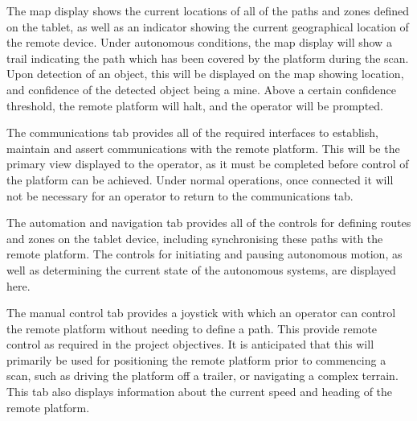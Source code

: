 \documentclass[main.tex]{subfiles}
\begin{document}
The map display shows the current locations of all of the paths and zones defined on the tablet, as well as an indicator showing the current geographical location of the remote device. Under autonomous conditions, the map display will show a trail indicating the path which has been covered by the platform during the scan. Upon detection of an object, this will be displayed on the map showing location, and confidence of the detected object being a mine. Above a certain confidence threshold, the remote platform will halt, and the operator will be prompted.

The communications tab provides all of the required interfaces to establish, maintain and assert communications with the remote platform. This will be the primary view displayed to the operator, as it must be completed before control of the platform can be achieved. Under normal operations, once connected it will not be necessary for an operator to return to the communications tab.

The automation and navigation tab provides all of the controls for defining routes and zones on the tablet device, including synchronising these paths with the remote platform. The controls for initiating and pausing autonomous motion, as well as determining the current state of the autonomous systems, are displayed here.

The manual control tab provides a joystick with which an operator can control the remote platform without needing to define a path. This provide remote control as required in the project objectives. It is anticipated that this will primarily be used for positioning the remote platform prior to commencing a scan, such as driving the platform off a trailer, or navigating a complex terrain. This tab also displays information about the current speed and heading of the remote platform. 
\end{document}
